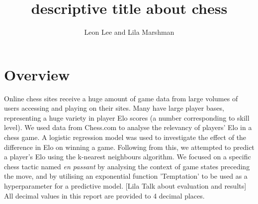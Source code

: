 \documentclass[10pt,a4paper]{article}
\title{descriptive title about chess}
\author{Leon Lee and Lila Marshman}
\begin{document}
\maketitle

\section{Overview}
Online chess sites receive a huge amount of game data from large volumes of users accessing and playing on their sites. Many have large player bases, representing a huge variety in player Elo scores (a number corresponding to skill level). We used data from Chess.com to analyse the relevancy of players' Elo in a chess game. A logistic regression model was used to investigate the effect of the difference in Elo on winning a game. Following from this, we attempted to predict a player's Elo using the k-nearest neighbours algorithm. We focused on a specific chess tactic named \textit{en passant} by analysing the context of game states preceding the move, and by utilising an exponential function 'Temptation' to be used as a hyperparameter for a predictive model. [Lila Talk about evaluation and results]\newline
All decimal values in this report are provided to 4 decimal places.
\end{document}
